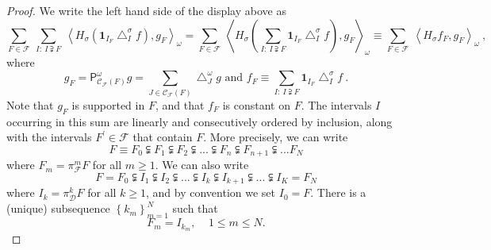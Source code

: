 \documentclass[10pt,a4paper]{amsart}
\begin{document}
\begin{proof}
We write the left hand side of the display above as%
\[
\sum_{F\in\mathcal{F}}\ \sum_{I:\ I\supsetneqq F}\ \left\langle H_{\sigma
}\left(  \mathbf{1}_{I_{F}}\bigtriangleup_{I}^{\sigma}f\right)  ,g_{F}%
\right\rangle _{\omega}=\sum_{F\in\mathcal{F}}\ \left\langle H_{\sigma}\left(
\sum_{I:\ I\supsetneqq F}\mathbf{1}_{I_{F}}\bigtriangleup_{I}^{\sigma
}f\right)  ,g_{F}\right\rangle _{\omega}\equiv\sum_{F\in\mathcal{F}%
}\ \left\langle H_{\sigma}f_{F},g_{F}\right\rangle _{\omega}\ ,
\]
where%
\[
g_{F}=\mathsf{P}_{\mathcal{C}_{\mathcal{F}}\left(  F\right)  }^{\omega}%
g=\sum_{J\in\mathcal{C}_{\mathcal{F}}\left(  F\right)  }\bigtriangleup
_{J}^{\omega}g\text{ and }f_{F}\equiv\sum_{I:\ I\supsetneqq F}\mathbf{1}%
_{I_{F}}\bigtriangleup_{I}^{\sigma}f\ .
\]
Note that $g_{F}$ is supported in $F$, and that $f_{F}$ is constant on $F$.
The intervals $I$ occurring in this sum are linearly and consecutively ordered
by inclusion, along with the intervals $F^{\prime}\in\mathcal{F}$ that contain
$F$. More precisely, we can write%
\[
F\equiv F_{0}\subsetneqq F_{1}\subsetneqq F_{2}\subsetneqq...\subsetneqq
F_{n}\subsetneqq F_{n+1}\subsetneqq...F_{N}%
\]
where $F_{m}=\pi_{\mathcal{F}}^{m}F$ for all $m\geq1$. We can also write%
\[
F=F_{0}\subsetneqq I_{1}\subsetneqq I_{2}\subsetneqq...\subsetneqq
I_{k}\subsetneqq I_{k+1}\subsetneqq...\subsetneqq I_{K}=F_{N}%
\]
where $I_{k}=\pi_{\mathcal{D}}^{k}F$ for all $k\geq1$, and by convention we
set $I_{0}=F$. There is a (unique) subsequence $\left\{  k_{m}\right\}
_{m=1}^{N}$ such that%
\[
F_{m}=I_{k_{m}},\ \ \ \ \ 1\leq m\leq N.
\]



\end{proof}
\end{document}
